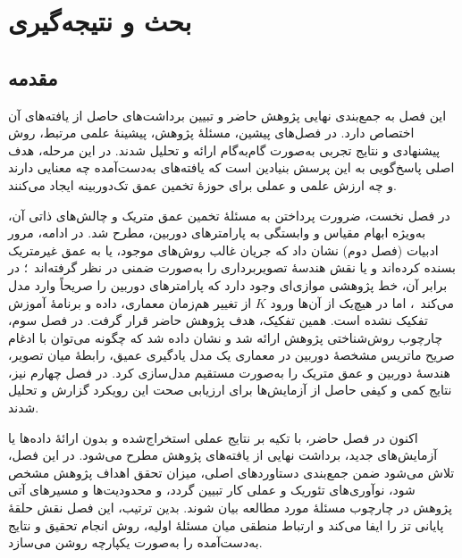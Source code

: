 \chapter{بحث و نتیجه‌گیری}

\section{مقدمه}
\label{sec:chapter5_intro}

این فصل به جمع‌بندی نهایی پژوهش حاضر و تبیین برداشت‌های حاصل از یافته‌های آن اختصاص دارد.
در فصل‌های پیشین، مسئلهٔ پژوهش، پیشینهٔ علمی مرتبط، روش پیشنهادی و نتایج تجربی
به‌صورت گام‌به‌گام ارائه و تحلیل شدند.
در این مرحله، هدف اصلی پاسخ‌گویی به این پرسش بنیادین است که
یافته‌های به‌دست‌آمده چه معنایی دارند
و چه ارزش علمی و عملی برای حوزهٔ تخمین عمق تک‌دوربینه ایجاد می‌کنند.

در فصل نخست، ضرورت پرداختن به مسئلهٔ تخمین عمق متریک
و چالش‌های ذاتی آن، به‌ویژه ابهام مقیاس و وابستگی به پارامترهای دوربین، مطرح شد.
در ادامه، مرور ادبیات (فصل دوم) نشان داد که
جریان غالب روش‌های موجود،
یا به عمق غیرمتریک بسنده کرده‌اند
و یا نقش هندسهٔ تصویربرداری را به‌صورت ضمنی در نظر گرفته‌اند~\cite{Eigen2014Depth,Godard2019Digging,Ranftl2019Robust,DepthAnythingV2}؛
در برابر آن، خط پژوهشی موازی‌ای وجود دارد که پارامترهای دوربین را صریحاً
وارد مدل می‌کند~\cite{Facil2019CAMConvs,Yin2023Metric3D,Saxena2023FOV,Piccinelli2024UniDepth}،
اما در هیچ‌یک از آن‌ها ورود $K$ از تغییر هم‌زمان معماری، داده و برنامهٔ آموزش
تفکیک نشده است. همین تفکیک، هدف پژوهش حاضر قرار گرفت.
در فصل سوم، چارچوب روش‌شناختی پژوهش ارائه شد
و نشان داده شد که چگونه می‌توان
با ادغام صریح ماتریس مشخصهٔ دوربین
در معماری یک مدل یادگیری عمیق،
رابطهٔ میان تصویر، هندسهٔ دوربین و عمق متریک را
به‌صورت مستقیم مدل‌سازی کرد.
در فصل چهارم نیز،
نتایج کمی و کیفی حاصل از آزمایش‌ها
برای ارزیابی صحت این رویکرد گزارش و تحلیل شدند.

اکنون در فصل حاضر،
با تکیه بر نتایج عملی استخراج‌شده
و بدون ارائهٔ داده‌ها یا آزمایش‌های جدید،
برداشت نهایی از یافته‌های پژوهش مطرح می‌شود.
در این فصل، تلاش می‌شود
ضمن جمع‌بندی دستاوردهای اصلی،
میزان تحقق اهداف پژوهش مشخص شود،
نوآوری‌های تئوریک و عملی کار تبیین گردد،
و محدودیت‌ها و مسیرهای آتی پژوهش
در چارچوب مسئلهٔ مورد مطالعه بیان شوند.
بدین ترتیب، این فصل نقش حلقهٔ پایانی تز را ایفا می‌کند
و ارتباط منطقی میان مسئلهٔ اولیه،
روش انجام تحقیق
و نتایج به‌دست‌آمده را به‌صورت یکپارچه روشن می‌سازد.


